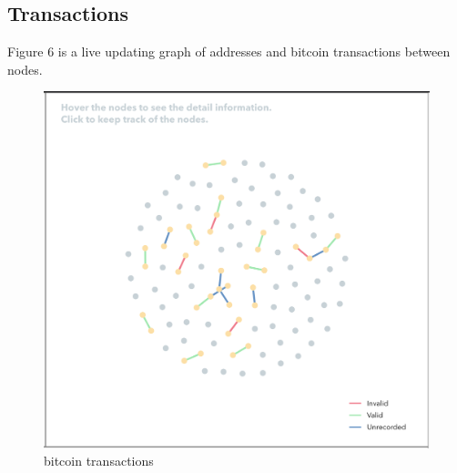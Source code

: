 \documentclass[journal, a4paper]{IEEEtran}
\begin{document}
\subsection{Transactions}
Figure 6 is a live updating graph of addresses and bitcoin transactions between nodes.
\begin{figure}[!hbt]
		\begin{center}
		\includegraphics[width=\columnwidth]{transactions.png}
		\caption{bitcoin transactions}
		\label{fig:overall_design}
		\end{center}
	\end{figure}
\end{document}
